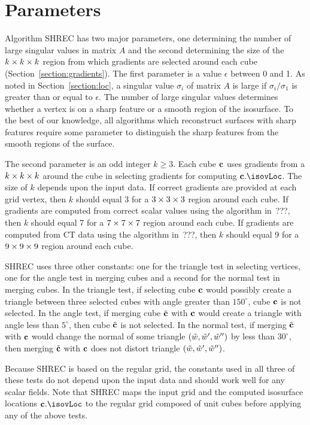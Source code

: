 \section{Parameters}
\label{section:parameters}

Algorithm SHREC has two major parameters,
one determining the number of large singular values in matrix $A$
and the second determining the size of the $k \times k \times k$ region 
from which gradients are selected around each cube
(Section~\ref{section:gradients}).
The first parameter is a value $\epsilon$ between 0 and 1.
As noted in Section~\ref{section:loc},
a singular value $\sigma_i$ of matrix $A$ 
is large if $\sigma_i/\sigma_1$ is greater than or equal to $\epsilon$.
The number of large singular values determines whether a vertex
is on a sharp feature or a smooth region of the isosurface.
To the best of our knowledge, all algorithms which reconstruct surfaces 
with sharp features require some parameter
to distinguish the sharp features from the smooth regions of the surface.

The second parameter is an odd integer $k \ge 3$.
Each cube $\mathbf{c}$ uses gradients from a $k \times k \times k$ around the cube
in selecting gradients for computing $\cb.\isovLoc$.
The size of $k$ depends upon the input data.
If correct gradients are provided at each grid vertex,
then $k$ should equal 3 for a $3 \times 3 \times 3$ region around each cube.
If gradients are computed from correct scalar values 
using the algorithm in~???,
then $k$ should equal 7 for a $7 \times 7 \times 7$ region around each cube.
If gradients are computed from CT data 
using the algorithm in~???,
then $k$ should equal 9 for a $9 \times 9 \times 9$ region around each cube.

SHREC uses three other constants:
one for the triangle test in selecting vertices,
one for the angle test in merging cubes
and a second for the normal test in merging cubes.
In the triangle test,
if selecting cube $\mathbf{c}$ would possibly create a triangle between three
selected cubes with angle greater than $150^\circ$, 
cube $\mathbf{c}$ is not selected.
In the angle test,
if merging cube ${\tilde{\mathbf{c}}}$ with $\mathbf{c}$ would create a triangle with angle
less than $5^\circ$, then cube ${\tilde{\mathbf{c}}}$ is not selected.
In the normal test,
if merging ${\tilde{\mathbf{c}}}$ with $\mathbf{c}$ would change the normal 
of some triangle $(\tilde{w},\tilde{w}',\tilde{w}'')$ by less than $30^\circ$,
then merging ${\tilde{\mathbf{c}}}$ with $\mathbf{c}$ does not distort triangle $(\tilde{w},\tilde{w}',\tilde{w}'')$.

Because SHREC is based on the regular grid,
the constants used in all three of these tests do not depend 
upon the input data and should work well for any scalar fields.
Note that SHREC maps the input grid 
and the computed isosurface locations $\cb.\isovLoc$
to the regular grid composed of unit cubes
before applying any of the above tests.
